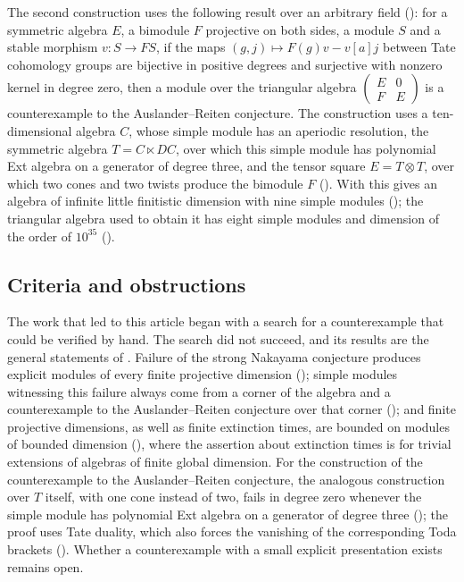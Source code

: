 The second construction uses the following result over an arbitrary field
(): for a symmetric algebra $E$, a
bimodule $F$ projective on both sides, a module $S$ and a stable morphism
${v\colon S\to FS}$, if the maps ${(g,j)\mapsto F(g)v-v[a]j}$ between Tate
cohomology groups are bijective in positive degrees and surjective with nonzero
kernel in degree zero, then a module over the triangular algebra
$\left(\begin{smallmatrix}E&0\\F&E\end{smallmatrix}\right)$ is a counterexample
to the Auslander--Reiten conjecture. The construction uses a ten-dimensional
algebra $C$, whose simple module has an aperiodic resolution, the symmetric
algebra ${T=C\ltimes DC}$, over which this simple module has polynomial Ext
algebra on a generator of degree three, and the tensor square ${E=T\otimes T}$,
over which two cones and two twists produce the bimodule $F$
(). With  this gives an algebra of
infinite little finitistic dimension with nine simple modules
(); the triangular algebra used to obtain it has eight
simple modules and dimension of the order of $10^{35}$ ().

\subsection*{Criteria and obstructions}

The work that led to this article began with a search for a counterexample that
could be verified by hand. The search did not succeed, and its results are the
general statements of .
Failure of the strong Nakayama conjecture produces explicit modules of every
finite projective dimension (); simple modules
witnessing this failure always come from a corner of the algebra and a
counterexample to the Auslander--Reiten conjecture over that corner
();
and finite projective dimensions, as well as finite extinction times, are
bounded on modules of bounded dimension
(), where the assertion
about extinction times is for trivial extensions of algebras of finite global
dimension. For the construction of the counterexample to the Auslander--Reiten
conjecture, the analogous construction over $T$
itself, with one cone instead of two, fails in degree zero
whenever the simple module has polynomial Ext algebra on a generator of degree
three (); the proof uses Tate duality,
which also forces the vanishing of the corresponding Toda brackets
(). Whether a counterexample with a small explicit
presentation exists remains open.

